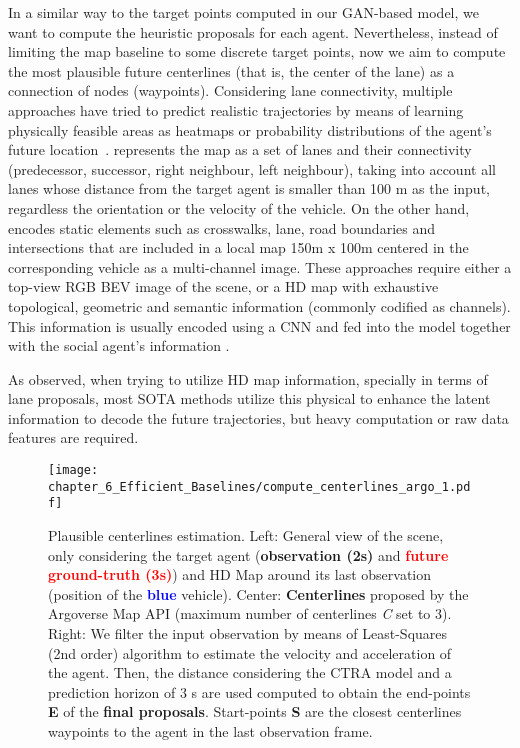 In a similar way to the target points computed in our \ac{GAN}-based model, we want to compute the heuristic proposals for each agent. Nevertheless, instead of limiting the map baseline to some discrete target points, now we aim to compute the most plausible future centerlines (that is, the center of the lane) as a connection of nodes (waypoints). Considering lane connectivity, multiple approaches have tried to predict realistic trajectories by means of learning physically feasible areas as heatmaps or probability distributions of the agent’s future location~\cite{dendorfer2020goal, sadeghian2019sophie, gilles2021home}. \cite{liang2020learning} represents the map as a set of lanes and their connectivity (predecessor, successor, right neighbour, left neighbour), taking into account all lanes whose distance from the target agent is smaller than 100 m as the input, regardless the orientation or the velocity of the vehicle. On the other hand, \cite{djuric2021multixnet} encodes static elements such as crosswalks, lane, road boundaries and intersections that are included in a local map 150m x 100m centered in the corresponding vehicle  as a multi-channel image.  These approaches require either a top-view RGB \ac{BEV} image of the scene, or a HD map with exhaustive topological, geometric and semantic information (commonly codified as channels). This information is usually encoded using a \ac{CNN} and fed into the model together with the social agent's information \cite{dendorfer2020goal, sadeghian2019sophie, gao2020vectornet}. 

As observed, when trying to utilize HD map information, specially in terms of lane proposals, most SOTA methods utilize this physical to enhance the latent information to decode the future trajectories, but heavy computation or raw data features are required. 

\begin{figure*}[]
	\centering
	\texttt{[image: chapter\_6\_Efficient\_Baselines/compute\_centerlines\_argo\_1.pdf]}
	\captionsetup{justification=justified}
	\caption[Plausible centerlines estimation in Argoverse 1]{Plausible centerlines estimation. Left: General view of the scene, only considering the target agent (\textbf{\textcolor{YellowOrange}{observation (2s)}} and \textbf{\textcolor{red}{future ground-truth (3s)}}) and HD Map around its last observation (position of the \textbf{\textcolor{blue}{blue}} vehicle). Center: \textbf{Centerlines} proposed by the Argoverse Map API (maximum number of centerlines \textit{C} set to 3). Right: We filter the input observation by means of Least-Squares (2nd order) algorithm to estimate the velocity and acceleration of the agent. Then, the distance considering the \ac{CTRA} model and a prediction horizon of 3 s are used computed to obtain the end-points \textbf{E} of the \textbf{final proposals}. Start-points \textbf{S} are the closest centerlines waypoints to the agent in the last observation frame.}
	\label{fig:chapter_6_Efficient_Baselines/efficient_baselines_hdmap_filtering}
\end{figure*}

